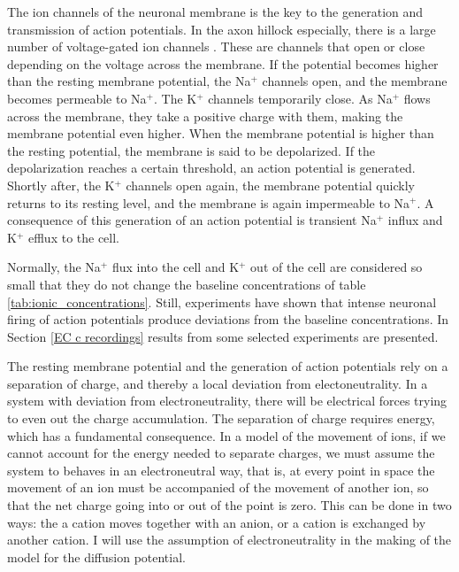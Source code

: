 \documentclass{article}
\begin{document}
The ion channels of the neuronal membrane is the key to the generation and transmission of action potentials. In the axon hillock especially, there is a large number of voltage-gated ion channels \cite{newworldencyclopedia}. These are channels that open or close depending on the voltage across the membrane. If the potential becomes higher than the resting membrane potential, the Na$^+$ channels open, and the membrane becomes permeable to Na$^+$. The K$^+$ channels temporarily close. As Na$^+$ flows across the membrane, they take a positive charge with them, making the membrane potential even higher. When the membrane potential is higher than the resting potential, the membrane is said to be depolarized. If the depolarization reaches a certain threshold, an action potential is generated. Shortly after, the K$^+$ channels open again, the membrane potential quickly returns to its resting level, and the membrane is again impermeable to Na$^+$. A consequence of this generation of an action potential is transient Na$^+$ influx and K$^+$ efflux to the cell. 


Normally, the Na$^+$ flux into the cell and K$^+$ out of the cell are considered so small that they do not change the baseline concentrations of table \ref{tab:ionic_concentrations}. Still, experiments \cite{Dietzel1982}\cite{Nicholson1987}\cite{CordingleySomjen} have shown that intense neuronal firing of action potentials produce deviations from the baseline concentrations. In Section \ref{EC c recordings} results from some selected experiments are presented.


The resting membrane potential and the generation of action potentials rely on a separation of charge, and thereby a local deviation from electoneutrality. In a system with deviation from electroneutrality, there will be electrical forces trying to even out the charge accumulation. The separation of charge requires energy, which has a fundamental consequence. In a model of the movement of ions, if we cannot account for the energy needed to separate charges, we must assume the system to behaves in an electroneutral way, that is, at every point in space the movement of an ion must be accompanied of the movement of another ion, so that the net charge going into or out of the point is zero. This can be done in two ways: the a cation moves together with an anion, or a cation is exchanged by another cation. I will use the assumption of electroneutrality in the making of the model for the diffusion potential.
\end{document}

